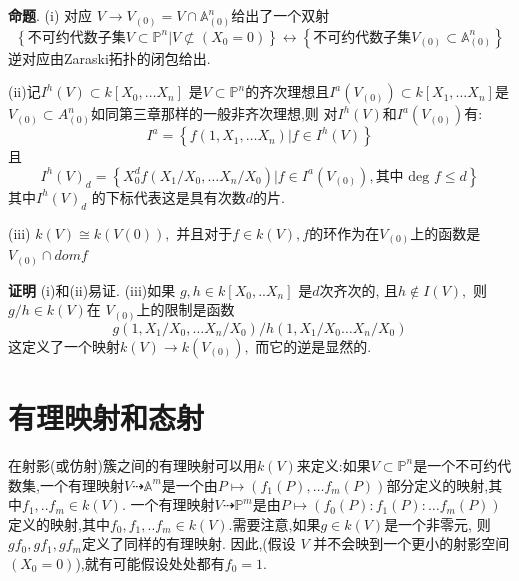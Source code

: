 \documentclass[UTF8]{book}
\begin{document}
		
		\textbf{命题}. (i) 对应 $V  \rightarrow V _{(0)}= V \cap \mathbb{A} ^{ n }_{(0)}$给出了一个双射
		\begin{equation*}
		\left\{
		\text {不可约代数子集} V\subset \mathbb{P}^{n} | V \not\subset(X_{0} = 0)
		\right\}
		\longleftrightarrow
		\left\{
		\text {不可约代数子集} V_{(0)}\subset \mathbb{A}^{n}_{(0)}
		\right\}
		\end{equation*}
		逆对应由Zaraski拓扑的闭包给出.
		
		
		(ii)记$I ^{ h }( V ) \subset k \left[ X _{0}, \ldots X _{ n }\right]$ 是$V \subset \mathbb{P} ^{ n }$的齐次理想且$I ^{ a }\left( V _{(0)}\right) \subset k \left[ X _{1}, \ldots X _{ n }\right]$是$V _{(0)} \subset A ^{ n }_{(0)} $如同第三章那样的一般非齐次理想,则 对$I ^{ h }( V )$和$I ^{ a }\left( V _{(0)}\right)$有:
		\begin{equation*}
		I ^{ a }=\left\{ f \left(1, X _{1}, \ldots X _{ n }\right) | f \in I ^{ h }( V )\right\}
		\end{equation*}
		且
		\begin{equation*}
		\left. I ^{ h }( V )_{ d }=\left\{ X _{0}^{d}  f \left( X _{1} / X _{0}, \dots\right. X _{ n } / X _{0}\right) | f \in I ^{ a} ( V_{(0)}), \text {其中 deg } f \leq d \right\}
		\end{equation*}
		其中$I ^{ h }( V )_{ d }$ 的下标代表这是具有次数$ d $的片. 
		
		
		(iii) $k ( V ) \cong k ( V (0)),$ 并且对于$f \in k ( V ),$$f$的环作为在$V _{(0)}$上的函数是 $V _{(0)} \cap dom f$
		
		
		
		\textbf{证明} (i)和(ii)易证. (iii)如果 $g, h \in k [ X_{0}, . . X_{n}]$ 是$ d $次齐次的, 且$h \notin I ( V ),$ 则$g / h \in k ( V )$在 $V _{(0)}$上的限制是函数
		\begin{equation*}
		g \left(1, X _{1} / X _{0}, \ldots X _{ n } / X _{0}\right) / h \left(1, X _{1} / X _{0} \ldots X _{ n } / X _{0}\right)
		\end{equation*}
		这定义了一个映射$k ( V ) \rightarrow k \left( V _{(0)}\right),$ 而它的逆是显然的.
		
		
	\section{有理映射和态射}
		在射影(或仿射)簇之间的有理映射可以用$ k(V) $来定义:如果$ V \subset \mathbb{P}^{n} $是一个不可约代数集,一个有理映射$V \dashrightarrow \mathbb{A} ^{ m }$是一个由$P \mapsto (f_{1}(P), \dots f_{m}(P))$部分定义的映射,其中$f_{1}, . . f_{m} \in k (V)$. 一个有理映射$V \dashrightarrow \mathbb{P} ^{ m }$是由$P \mapsto\left( f _{0}( P ): f _{1}( P ): \ldots f _{ m }( P )\right)$定义的映射,其中$f _{0}, f _{1}, . . f _{ m } \in k ( V )$.需要注意,如果$g \in k ( V )$是一个非零元, 则$gf _{0}, gf _{1}, gf_{ m }$定义了同样的有理映射. 因此,(假设 $ V$ 并不会映到一个更小的射影空间$( X _{0}=0)$),就有可能假设处处都有$f_{0}=1$.
		
\end{document}
